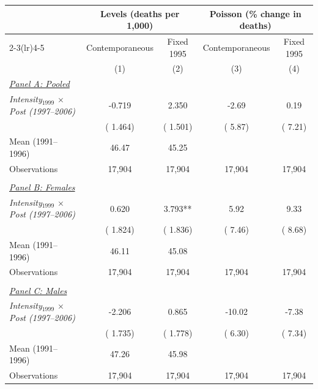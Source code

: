 \begin{tabular}{lcccc} \hline \hline
& \multicolumn{2}{c}{Levels (deaths per 1,000)} & \multicolumn{2}{c}{Poisson (\% change in deaths)} \\ \cmidrule(lr){2-3}\cmidrule(lr){4-5}
& Contemporaneous & Fixed 1995 & Contemporaneous & Fixed 1995 \\ 
& \multicolumn{1}{c}{(1)} & \multicolumn{1}{c}{(2)} & \multicolumn{1}{c}{(3)} & \multicolumn{1}{c}{(4)} \\ \toprule
\underline{\textit{Panel A: Pooled}} \\ 
\textit{Intensity$_{1999}$ $\times$ Post (1997--2006)} &       -0.719 &        2.350 &        -2.69 &         0.19 \\ 
 & (       1.464) & (       1.501) & (        5.87) & (        7.21) \\ 
Mean (1991--1996) &        46.47 &        45.25 & & \\ 
Observations &       17,904 &       17,904 &       17,904 &       17,904 \\ 
  & & & & \\ 
\underline{\textit{Panel B: Females}} \\ 
\textit{Intensity$_{1999}$ $\times$ Post (1997--2006)} &        0.620 &        3.793** &         5.92 &         9.33 \\ 
 & (       1.824) & (       1.836) & (        7.46) & (        8.68) \\ 
Mean (1991--1996) &        46.11 &        45.08 & & \\ 
Observations &       17,904 &       17,904 &       17,904 &       17,904 \\ 
  & & & & \\ 
\underline{\textit{Panel C: Males}} \\ 
\textit{Intensity$_{1999}$ $\times$ Post (1997--2006)} &       -2.206 &        0.865 &       -10.02 &        -7.38 \\ 
 & (       1.735) & (       1.778) & (        6.30) & (        7.34) \\ 
Mean (1991--1996) &        47.26 &        45.98 & & \\ 
Observations &       17,904 &       17,904 &       17,904 &       17,904 \\ 
\bottomrule
\end{tabular}